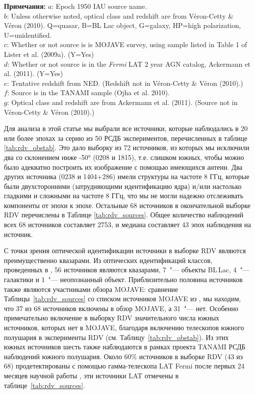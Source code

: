 \begin{table}
\textbf{Примечания:}
$a$: Epoch 1950 IAU source name.\\
$b$: Unless otherwise noted, optical class and redshift are from V\'{e}ron-Cetty \& V\'{e}ron
(2010).
Q=quasar, B=BL Lac object, G=galaxy, HP=high polarization, U=unidentified.\\
$c$: Whether or not source is is MOJAVE survey, using sample
listed in Table 1 of Lister et al. (2009a). (Y=Yes)\\
$d$: Whether or not source is in the {\em Fermi} LAT 2 year AGN catalog, Ackermann et al. (2011).
(Y=Yes)\\
$e$: Tentative redshift from NED. (Redshift not in V\'{e}ron-Cetty \& V\'{e}ron (2010).)\\
$f$: Source is in the TANAMI sample (Ojha et al. 2010).\\
$g$: Optical class and redshift are from Ackermann et al. (2011). (Source not in V\'{e}ron-Cetty \&
V\'{e}ron (2010).)\\
\end{table}

Для анализа в этой статье мы выбрали все источники, которые наблюдались в 20 или более эпохах за
серию из 50 РСДБ экспериментов, перечисленных в таблице \ref{tab:rdv_obstab}. Это дало выборку из 72
источников, из которых мы исключили два со склонением ниже \ang{-50} (0208 и
1815), т.\:е. слишком южных, чтобы можно было адекватно построить их изображение с
помощью имеющихся антенн. Два других источника (0238 и 1404+286) имели структуры на
частоте 8 ГГц, которые были двухсторонними (затрудняющими идентификацию ядра) и/или настолько
гладкими и сложными на частоте 8 ГГц, что мы не могли надежно отслеживать компоненты от эпохи к
эпохе. Остальные 68 источников в окончательной выборке RDV перечислены в Таблице
\ref{tab:rdv_sources}. Общее количество наблюдений всех 68 источников составляет 2753, и медиана
составляет 43 эпох наблюдения на источник.

С точки зрения оптической идентификации источники в выборке RDV являются преимущественно квазарами.
Из оптических идентификаций классов, проведенных в \cite{Veron_2010}, 56 источников являются
квазарами, 7~"--- объекты BL\,Lac, 4~"--- галактики и 1~"--- неопознанный объект. Приблизительно
половина источников также являются участниками обзора MOJAVE: сравнение
Таблицы~\ref{tab:rdv_sources} со списком источников MOJAVE из \cite{Lister_2009a}, мы находим, что
37 из 68 источников включены в обзор MOJAVE, а 31~"--- нет. Особенно примечательно включение в
выборку RDV значительного числа южных источников, которых нет в MOJAVE, благодаря включению
телескопов южного полушария в эксперименты RDV (см. Таблицу~\ref{tab:rdv_obstab}). Из этих южных
источников шесть также наблюдаются в рамках проекта TANAMI \cite{Ojha_2010} РСДБ наблюдений южного
полушария. Около 60\% источников в выборке RDV (43 из 68) продетектированы с помощью гамма-телескопа
LAT Fermi после первых 24 месяцев научной работы \cite{Ackermann_2011}, эти источники LAT отмечены в
таблице~\ref{tab:rdv_sources}.

